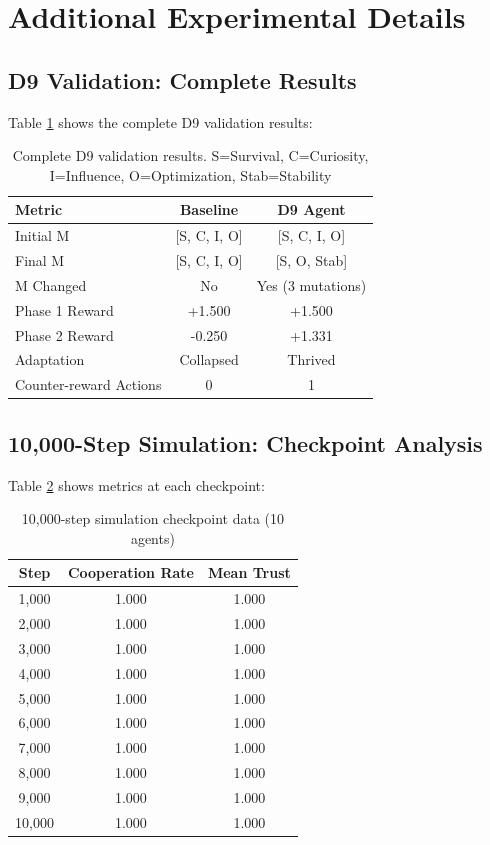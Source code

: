 \documentclass{article}
\begin{document}
\section{Additional Experimental Details}

\subsection{D9 Validation: Complete Results}

Table \ref{tab:d9_full} shows the complete D9 validation results:

\begin{table}[h]
\centering
\begin{tabular}{lcc}
\toprule
\textbf{Metric} & \textbf{Baseline} & \textbf{D9 Agent} \\
\midrule
Initial M & [S, C, I, O] & [S, C, I, O] \\
Final M & [S, C, I, O] & [S, O, Stab] \\
M Changed & No & Yes (3 mutations) \\
Phase 1 Reward & +1.500 & +1.500 \\
Phase 2 Reward & -0.250 & +1.331 \\
Adaptation & Collapsed & Thrived \\
Counter-reward Actions & 0 & 1 \\
\bottomrule
\end{tabular}
\caption{Complete D9 validation results. S=Survival, C=Curiosity, I=Influence, O=Optimization, Stab=Stability}
\label{tab:d9_full}
\end{table}

\subsection{10,000-Step Simulation: Checkpoint Analysis}

Table \ref{tab:10k_checkpoints} shows metrics at each checkpoint:

\begin{table}[h]
\centering
\begin{tabular}{ccc}
\toprule
\textbf{Step} & \textbf{Cooperation Rate} & \textbf{Mean Trust} \\
\midrule
1,000 & 1.000 & 1.000 \\
2,000 & 1.000 & 1.000 \\
3,000 & 1.000 & 1.000 \\
4,000 & 1.000 & 1.000 \\
5,000 & 1.000 & 1.000 \\
6,000 & 1.000 & 1.000 \\
7,000 & 1.000 & 1.000 \\
8,000 & 1.000 & 1.000 \\
9,000 & 1.000 & 1.000 \\
10,000 & 1.000 & 1.000 \\
\bottomrule
\end{tabular}
\caption{10,000-step simulation checkpoint data (10 agents)}
\label{tab:10k_checkpoints}
\end{table}
\end{document}
